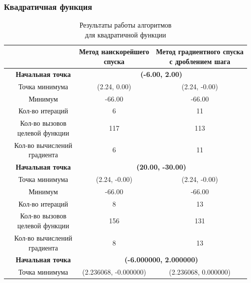 \subsubsection{Квадратичная функция}

\begin{table}[H]
        \centering
        \vspace*{-1.5em}
        \caption{Результаты работы алгоритмов\\для квадратичной функции}
        \footnotesize
        \begin{tabular}{|c|c|c|c|}
        \hline
        & &\makecell{Метод наискорейшего\\спуска} &\makecell{Метод градиентного спуска\\с дроблением шага} \\
        \hline
	\multirow{10}{*}{\rotatebox[origin=c]{90}{$\varepsilon = 0.01$}}&\textbf{Начальная точка} &\multicolumn{2}{c|}{\textbf{(-6.00, 2.00)}}\\
	\cline{2-4}
	&Точка минимума &(2.24, 0.00) &(2.24, -0.00) \\ 
	\cline{2-4}
	&Минимум &-66.00 &-66.00 \\ 
	\cline{2-4}
	&Кол-во итераций &6 &11 \\ 
	\cline{2-4}
	&\makecell{Кол-во вызовов\\целевой функции} &117 &113 \\ 
	\cline{2-4}
	&\makecell{Кол-во вычислений\\градиента} &6 &11 \\ 
	\cline{2-4}
\cline{2-4}&\textbf{Начальная точка} &\multicolumn{2}{c|}{\textbf{(20.00, -30.00)}}\\
	\cline{2-4}
	&Точка минимума &(2.24, -0.00) &(2.24, -0.00) \\ 
	\cline{2-4}
	&Минимум &-66.00 &-66.00 \\ 
	\cline{2-4}
	&Кол-во итераций &8 &13 \\ 
	\cline{2-4}
	&\makecell{Кол-во вызовов\\целевой функции} &156 &131 \\ 
	\cline{2-4}
	&\makecell{Кол-во вычислений\\градиента} &8 &13 \\ 
	\cline{2-4}
	\hline
	\multirow{10}{*}{\rotatebox[origin=c]{90}{$\varepsilon = 1e-06$}}&\textbf{Начальная точка} &\multicolumn{2}{c|}{\textbf{(-6.000000, 2.000000)}}\\
	\cline{2-4}
	&Точка минимума &(2.236068, -0.000000) &(2.236068, 0.000000) \\ 

\end{tabular}
\end{table}

